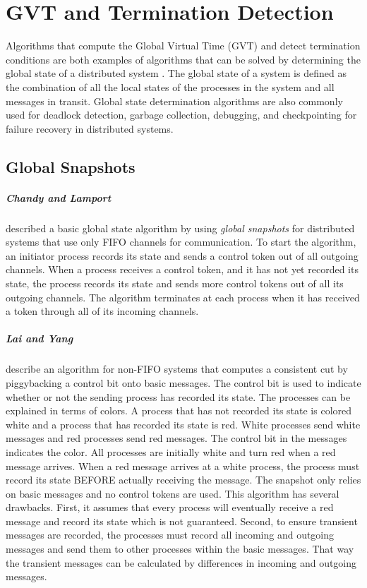 \documentclass[11pt]{book}
\begin{document}
\chapter{GVT and Termination Detection}\label{gvt_termination}

Algorithms that compute the Global Virtual Time (GVT) and detect termination conditions are both
examples of algorithms that can be solved by determining the global state of a distributed system
\cite{chandy-85,lai-87,mattern-89}.  The global state of a system is defined as the combination of
all the local states of the processes in the system and all messages in transit.  Global state
determination algorithms are also commonly used for deadlock detection, garbage collection,
debugging, and checkpointing for failure recovery in distributed systems.

\section{Global Snapshots}

\paragraph{Chandy and Lamport} \cite{chandy-85} described a basic global state algorithm by using
\emph{global snapshots} for distributed systems that use only FIFO channels for communication.  To
start the algorithm, an initiator process records its state and sends a control token out of all
outgoing channels.  When a process receives a control token, and it has not yet recorded its state,
the process records its state and sends more control tokens out of all its outgoing channels.  The
algorithm terminates at each process when it has received a token through all of its incoming
channels.

\paragraph{Lai and Yang} \cite{lai-87} describe an algorithm for non-FIFO systems that computes a
consistent cut by piggybacking a control bit onto basic messages.  The control bit is used to
indicate whether or not the sending process has recorded its state.  The processes can be explained
in terms of colors.  A process that has not recorded its state is colored white and a process that
has recorded its state is red.  White processes send white messages and red processes send red
messages.  The control bit in the messages indicates the color.  All processes are initially white
and turn red when a red message arrives.  When a red message arrives at a white process, the process
must record its state BEFORE actually receiving the message.  The snapshot only relies on basic
messages and no control tokens are used.  This algorithm has several drawbacks.  First, it assumes
that every process will eventually receive a red message and record its state which is not
guaranteed.  Second, to ensure transient messages are recorded, the processes must record all
incoming and outgoing messages and send them to other processes within the basic messages.  That way
the transient messages can be calculated by differences in incoming and outgoing messages.
\end{document}
